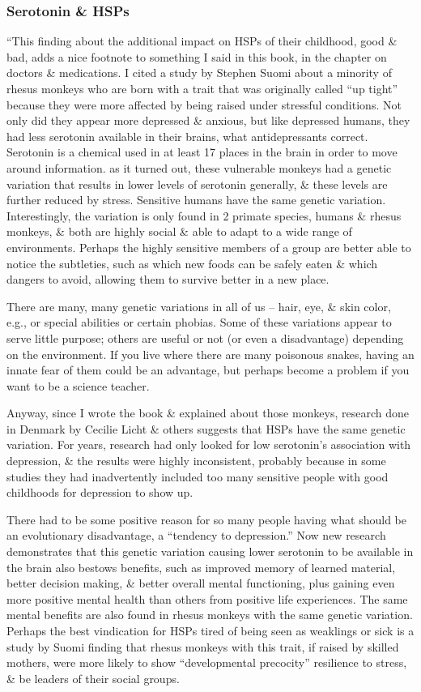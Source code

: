 \documentclass{article}
\numberwithin{equation}{section}
\begin{document}
\subsubsection*{Serotonin \& HSPs}
``This finding about the additional impact on HSPs of their childhood, good \& bad, adds a nice footnote to something I said in this book, in the chapter on doctors \& medications. I cited a study by Stephen Suomi about a minority of rhesus monkeys who are born with a trait that was originally called ``up tight'' because they were more affected by being raised under stressful conditions. Not only did they appear more depressed \& anxious, but like depressed humans, they had less serotonin available in their brains, what antidepressants correct. Serotonin is a chemical used in at least 17 places in the brain in order to move around information. as it turned out, these vulnerable monkeys had a genetic variation that results in lower levels of serotonin generally, \& these levels are further reduced by stress. Sensitive humans have the same genetic variation. Interestingly, the variation is only found in 2 primate species, humans \& rhesus monkeys, \& both are highly social \& able to adapt to a wide range of environments. Perhaps the highly sensitive members of a group are better able to notice the subtleties, such as which new foods can be safely eaten \& which dangers to avoid, allowing them to survive better in a new place.

There are many, many genetic variations in all of us -- hair, eye, \& skin color, e.g., or special abilities or certain phobias. Some of these variations appear to serve little purpose; others are useful or not (or even a disadvantage) depending on the environment. If you live where there are many poisonous snakes, having an innate fear of them could be an advantage, but perhaps become a problem if you want to be a science teacher.

Anyway, since I wrote the book \& explained about those monkeys, research done in Denmark by Cecilie Licht \& others suggests that HSPs have the same genetic variation. For years, research had only looked for low serotonin's association with depression, \& the results were highly inconsistent, probably because in some studies they had inadvertently included too many sensitive people with good childhoods for depression to show up.

There had to be some positive reason for so many people having what should be an evolutionary disadvantage, a ``tendency to depression.'' Now new research demonstrates that this genetic variation causing lower serotonin to be available in the brain also bestows benefits, such as improved memory of learned material, better decision making, \& better overall mental functioning, plus gaining even more positive mental health than others from positive life experiences. The same mental benefits are also found in rhesus monkeys with  the same genetic variation. Perhaps the best vindication for HSPs tired of being seen as weaklings or sick is a study by Suomi finding that rhesus monkeys with this trait, if raised by skilled mothers, were more likely to show ``developmental precocity'' resilience to stress, \& be leaders of their social groups.
\end{document}

